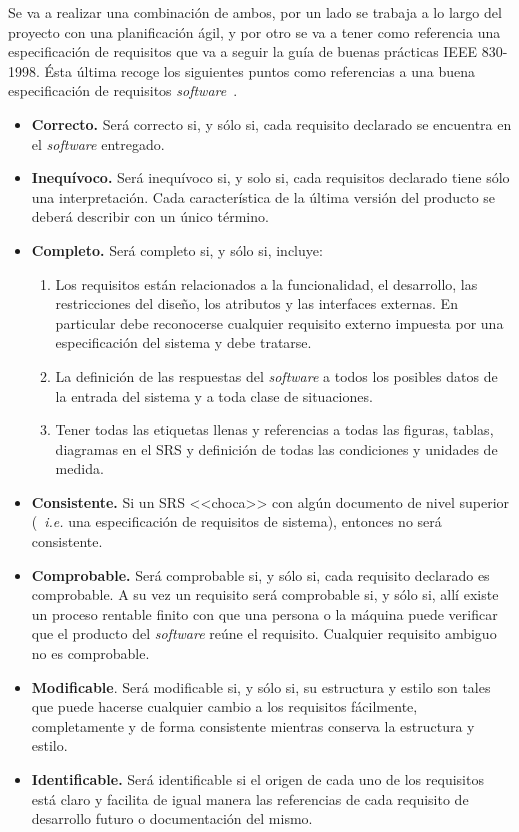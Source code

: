 Se va a realizar una combinación de ambos, por un lado se trabaja a lo largo del proyecto con una planificación ágil, y por otro se va a tener como referencia una especificación de requisitos que va a seguir la guía de buenas prácticas IEEE 830-1998. Ésta última recoge los siguientes puntos como referencias a una buena especificación de requisitos \textit{software}~\cite{ingenieriasoftwareytiemporeal_2020}.
\begin{itemize}
\item \textbf{Correcto.} Será correcto si, y sólo si, cada requisito declarado se encuentra en el \textit{software} entregado.
\item \textbf{Inequívoco.} Será inequívoco si, y solo si, cada requisitos declarado tiene sólo una interpretación. Cada característica de la última versión del producto se deberá describir con un único término.
\item \textbf{Completo.} Será completo si, y sólo si, incluye:
\begin{enumerate}
\item Los requisitos están relacionados a la funcionalidad, el desarrollo, las restricciones del diseño, los atributos y las interfaces externas. En particular debe reconocerse cualquier requisito externo impuesta por una especificación del sistema y debe tratarse.
\item La definición de las respuestas del \textit{software} a todos los posibles datos de la entrada del sistema y a toda clase de situaciones.
\item Tener todas las etiquetas llenas y referencias a todas las figuras, tablas, diagramas en el SRS y definición de todas las condiciones y unidades de medida.
\end{enumerate}
\item \textbf{Consistente.} Si un SRS <<choca>> con algún documento de nivel superior (~\textit{i.e.} una especificación de requisitos de sistema), entonces no será consistente.
\item \textbf{Comprobable.} Será comprobable si, y sólo si, cada requisito declarado es comprobable. A su vez un requisito será comprobable si, y sólo si, allí existe un proceso rentable finito con que una persona o la máquina puede verificar que el producto del \textit{software} reúne el requisito. Cualquier requisito ambiguo no es comprobable.
\item \textbf{Modificable}. Será modificable si, y sólo si, su estructura y estilo son tales que puede hacerse cualquier cambio a los requisitos fácilmente, completamente y de forma consistente mientras conserva la estructura y estilo.
\item \textbf{Identificable.} Será identificable si el origen de cada uno de los requisitos está claro y facilita de igual manera las referencias de cada requisito de desarrollo futuro o documentación del mismo.
\end{itemize}


